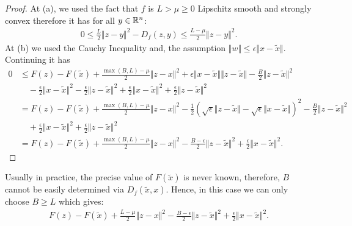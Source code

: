 \documentclass[12pt]{article}
\begin{document}
\begin{proof}
            At (a), we used the fact that $f$ is $L > \mu \ge 0$ Lipschitz smooth and strongly convex therefore it has for all $y \in \mathbb R^n$: 
            \begin{align*}
                0 
                \le \frac{L}{2}\Vert z - y\Vert^2  - D_f(z, y)
                \le \frac{L - \mu}{2}\Vert z - y\Vert^2. 
            \end{align*}
            At (b) we used the Cauchy Inequality and, the assumption $\Vert w\Vert \le \epsilon \Vert x - \tilde x\Vert$. 
            Continuing it has 
            \begin{align*}
                0 &\le 
                F(z) - F(\tilde x) + \frac{\max(B, L) - \mu}{2}\Vert z - x\Vert^2
                + \epsilon \Vert x - \tilde x\Vert\Vert z - \tilde x\Vert 
                - \frac{B}{2}\Vert z - \tilde x\Vert^2
                    \\&\quad 
                    - \frac{\epsilon}{2}\Vert x - \tilde x\Vert^2 - \frac{\epsilon}{2}\Vert z - \tilde x \Vert^2
                    + \frac{\epsilon}{2}\Vert x - \tilde x\Vert^2 + \frac{\epsilon}{2}\Vert z - \tilde x \Vert^2
                \\
                &= F(z) - F(\tilde x) + \frac{\max(B, L) - \mu}{2}\Vert z - x\Vert^2
                - \frac{1}{2}\left(
                    \sqrt{\epsilon}\Vert z - \tilde x\Vert - \sqrt{\epsilon}\Vert x - \tilde x\Vert
                \right)^2
                - \frac{B}{2}\Vert z - \tilde x\Vert^2
                    \\
                    &\quad 
                    + \frac{\epsilon}{2}\Vert x - \tilde x\Vert^2 + \frac{\epsilon}{2}\Vert z - \tilde x \Vert^2
                \\
                &= F(z) - F(\tilde x) + \frac{\max(B, L) - \mu}{2}\Vert z - x\Vert^2
                - \frac{B - \epsilon}{2}\Vert z - \tilde x\Vert^2
                + \frac{\epsilon}{2}\Vert x - \tilde x \Vert^2. 
            \end{align*}
        \end{proof}
        \begin{remark}
            Usually in practice, the precise value of $F(\tilde x)$ is never known, therefore, $B$ cannot be easily determined via $D_f(\tilde x, x)$. 
            Hence, in this case we can only choose $B \ge L$ which gives: 
            \begin{align*}
                F(z) - F(\tilde x) + \frac{L - \mu}{2}\Vert z - x\Vert^2
                - \frac{B - \epsilon}{2}\Vert z - \tilde x\Vert^2
                + \frac{\epsilon}{2}\Vert x - \tilde x \Vert^2.
            \end{align*}
        \end{remark}
\end{document}
